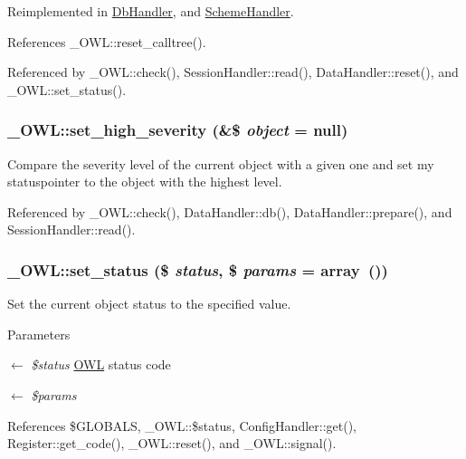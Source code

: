 Reimplemented in \hyperlink{classDbHandler_a9982df4830f05803935bb31bac7fae3d}{DbHandler}, and \hyperlink{classSchemeHandler_aa25feb4a70d67b3d571904be4b2f50bc}{SchemeHandler}.



References \_\-OWL::reset\_\-calltree().



Referenced by \_\-OWL::check(), SessionHandler::read(), DataHandler::reset(), and \_\-OWL::set\_\-status().

\subsubsection[{set\_\-high\_\-severity}]{\setlength{\rightskip}{0pt plus 5cm}\_\-OWL::set\_\-high\_\-severity (\&\$ {\em object} = {\ttfamily null})}\label{class__OWL_a576829692a3b66e3d518853bf43abae3}
Compare the severity level of the current object with a given one and set my statuspointer to the object with the highest level. 

Referenced by \_\-OWL::check(), DataHandler::db(), DataHandler::prepare(), and SessionHandler::read().

\subsubsection[{set\_\-status}]{\setlength{\rightskip}{0pt plus 5cm}\_\-OWL::set\_\-status (\$ {\em status}, \/  \$ {\em params} = {\ttfamily array~()})}\label{class__OWL_aea912d0ede9b3c2a69b79072d94d4787}
Set the current object status to the specified value.


\begin{DoxyParams}{Parameters}
\item[\mbox{$\leftarrow$} {\em \$status}]\hyperlink{classOWL}{OWL} status code \item[\mbox{$\leftarrow$} {\em \$params}]\end{DoxyParams}


References \$GLOBALS, \_\-OWL::\$status, ConfigHandler::get(), Register::get\_\-code(), \_\-OWL::reset(), and \_\-OWL::signal().



